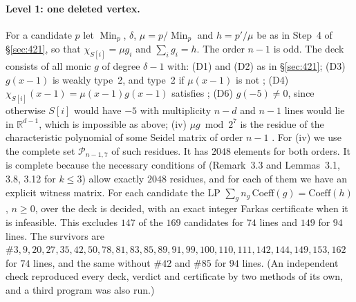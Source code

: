 \documentclass[11pt]{article}
\theoremstyle{definition}
\newcommand{\R}{\mathbb{R}}
\newcommand{\Min}{\operatorname{Min}}
\begin{document}
\paragraph{Level 1: one deleted vertex.} For a candidate $p$ let $\Min_p$, $\delta$, $\mu=p/\Min_p$ and
$h=p'/\mu$ be as in Step~4 of \S\ref{sec:421}, so that $\chi_{S[i]}=\mu g_i$ and $\sum_ig_i=h$. The
order $n-1$ is odd. The deck consists of all monic $g$ of degree $\delta-1$ with:
(D1) and (D2) as in \S\ref{sec:421};
(D3) $g(x-1)$ is weakly type~2, and type~2 if $\mu(x-1)$ is not \cite[Lemmas~2.7, 2.8]{GSY21};
(D4) $\chi_{S[i]}(x-1)=\mu(x-1)g(x-1)$ satisfies \cite[Thm.~2.5]{GSY21};
(D6) $g(-5)\ne0$, since otherwise $S[i]$ would have $-5$ with multiplicity $n-d$ and $n-1$ lines would
lie in $\R^{d-1}$, which is impossible as above;
(iv) $\mu g\bmod 2^7$ is the residue of the characteristic polynomial of some Seidel matrix of order
$n-1$ \cite[\S5, condition~(iv)]{GSY23}.
For (iv) we use the complete set $\mathcal P_{n-1,7}$ of such residues. It has $2048$ elements for both
orders. It is complete because the necessary conditions of \cite[\S3]{GY19} (Remark~3.3 and
Lemmas~3.1, 3.8, 3.12 for $k\le3$) allow exactly $2048$ residues, and for each of them we have an
explicit witness matrix. For each candidate the LP $\sum_gn_g\,\mathrm{Coeff}(g)=\mathrm{Coeff}(h)$,
$n\ge0$, over the deck is decided, with an exact integer Farkas certificate when it is infeasible.
This excludes $147$ of the $169$ candidates for $74$ lines and $149$ for $94$ lines. The survivors
are $\#3,9,20,27,35,42,50,78,81,83,85,89,91,99,100,110,111,142,144,149,153,162$ for $74$ lines,
and the same without $\#42$ and $\#85$ for $94$ lines. (An independent check reproduced every deck,
verdict and certificate by two methods of its own, and a third
program was also run.)
\end{document}
